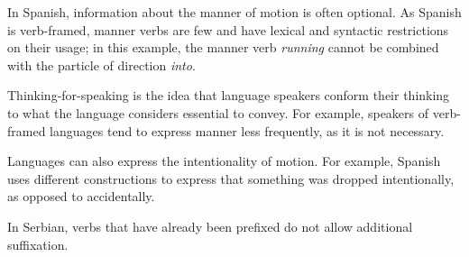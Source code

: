 \documentclass{article}
\begin{document}
\clearpage

\problem
In Spanish, information about the manner of motion is often optional. As Spanish is verb-framed, manner verbs are few and have lexical and syntactic restrictions on their usage; in this example, the manner verb \textit{running} cannot be combined with the particle of direction \textit{into}.

\clearpage

\problem
Thinking-for-speaking is the idea that language speakers conform their thinking to what the language considers essential to convey. For example, speakers of verb-framed languages tend to express manner less frequently, as it is not necessary.

\clearpage

\problem
Languages can also express the intentionality of motion. For example, Spanish uses different constructions to express that something was dropped intentionally, as opposed to accidentally.

\clearpage

\problem
In Serbian, verbs that have already been prefixed do not allow additional suffixation.
\end{document}
